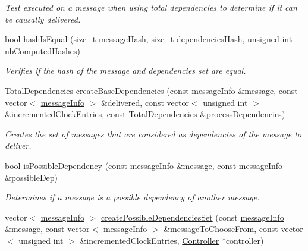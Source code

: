 \begin{DoxyCompactItemize}
\begin{DoxyCompactList}\small\item\em Test executed on a message when using total dependencies to determine if it can be causally delivered. \end{DoxyCompactList}\item 
bool \hyperlink{class_hash_error_detector_a93b22ebde71c18f801319b33ce30899c}{hash\+Is\+Equal} (size\+\_\+t message\+Hash, size\+\_\+t dependencies\+Hash, unsigned int nb\+Computed\+Hashes)
\begin{DoxyCompactList}\small\item\em Verifies if the hash of the message and dependencies set are equal. \end{DoxyCompactList}\item 
\hyperlink{class_total_dependencies}{Total\+Dependencies} \hyperlink{class_hash_error_detector_a09b0d73b3a717ddf850fe644848c15c6}{create\+Base\+Dependencies} (const \hyperlink{structures_8h_a7e7bdc1d2fff8a9436f2f352b2711ed6}{message\+Info} \&message, const vector$<$ \hyperlink{structures_8h_a7e7bdc1d2fff8a9436f2f352b2711ed6}{message\+Info} $>$ \&delivered, const vector$<$ unsigned int $>$ \&incremented\+Clock\+Entries, const \hyperlink{class_total_dependencies}{Total\+Dependencies} \&process\+Dependencies)
\begin{DoxyCompactList}\small\item\em Creates the set of messages that are considered as dependencies of the message to deliver. \end{DoxyCompactList}\item 
bool \hyperlink{class_hash_error_detector_aaaceeb3d2d27d5f3c85a9b80f959e0fe}{is\+Possible\+Dependency} (const \hyperlink{structures_8h_a7e7bdc1d2fff8a9436f2f352b2711ed6}{message\+Info} \&message, const \hyperlink{structures_8h_a7e7bdc1d2fff8a9436f2f352b2711ed6}{message\+Info} \&possible\+Dep)
\begin{DoxyCompactList}\small\item\em Determines if a message is a possible dependency of another message. \end{DoxyCompactList}\item 
vector$<$ \hyperlink{structures_8h_a7e7bdc1d2fff8a9436f2f352b2711ed6}{message\+Info} $>$ \hyperlink{class_hash_error_detector_ae8605d778886baa20648a9f5955c5943}{create\+Possible\+Dependencies\+Set} (const \hyperlink{structures_8h_a7e7bdc1d2fff8a9436f2f352b2711ed6}{message\+Info} \&message, const vector$<$ \hyperlink{structures_8h_a7e7bdc1d2fff8a9436f2f352b2711ed6}{message\+Info} $>$ \&message\+To\+Choose\+From, const vector$<$ unsigned int $>$ \&incremented\+Clock\+Entries, \hyperlink{class_controller}{Controller} $\ast$controller)

\end{DoxyCompactItemize}
